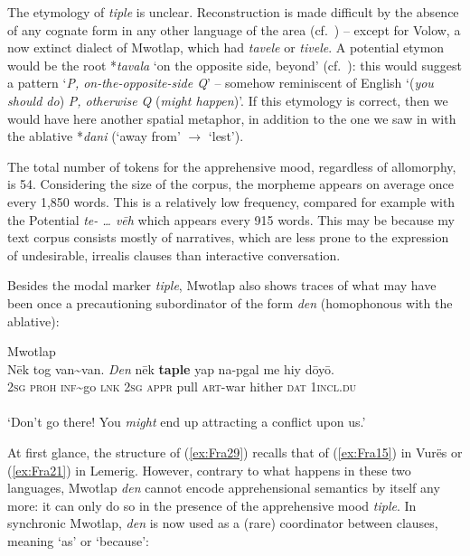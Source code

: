 \documentclass[output=paper,colorlinks,citecolor=brown]{langscibook}
\begin{document}
The etymology of \textit{tiple} is unclear. Reconstruction is made difficult by the absence of any cognate form in any other language of the area (cf.\ ) -- except for Volow, a now extinct dialect of Mwotlap, which had \textit{tavele} or \textit{tivele}. A potential etymon would be the root *\textit{tavala} `on the opposite side, beyond' (cf.\ \citealt[194]{Clark2009}): this would suggest a pattern `\textit{P, on-the-opposite-side Q}' -- somehow reminiscent of English `(\textit{you should do}) \textit{P, otherwise Q} (\textit{might happen})'. If this etymology is correct, then we would have here another spatial metaphor, in addition to the one we saw in  with the ablative *\textit{dani} (`away from' ${\rightarrow}$ `lest'). 

The total number of tokens for the apprehensive mood, regardless of allomorphy, is 54. Considering the size of the corpus, the morpheme appears on average once every 1,850 words. This is a relatively low frequency, compared for example with the Potential  \textit{te- {\ldots} vēh} which appears every 915 words. This may be because my text corpus consists mostly of narratives, which are less prone to the expression of undesirable, irrealis clauses than interactive conversation.

Besides the modal marker \textit{tiple}, Mwotlap also shows traces of what may have been once a precautioning subordinator of the form \textit{den} (homophonous with the ablative):
 
\ea \label{ex:Fra29} \textnormal{Mwotlap}  \\
\gll Nēk tog van\textasciitilde van. \textit{Den} nēk \textbf{taple} yap na-pgal me hiy dōyō. \\
\textsc{2sg} \textsc{proh} \textsc{inf}\textasciitilde go \textsc{lnk} \textsc{2sg} \textsc{appr} pull \textsc{art}-war hither \textsc{dat} \textsc{1incl.du} \\
 \\
`Don't go there! You \textit{might} end up attracting a conflict upon us.' 
\z

\noindent At first glance, the structure of (\ref{ex:Fra29}) recalls that of (\ref{ex:Fra15}) in Vurës or (\ref{ex:Fra21}) in Lemerig. However, contrary to what happens in these two languages, Mwotlap \textit{den} cannot encode apprehensional semantics by itself any more: it can only do so in the presence of the apprehensive mood \textit{tiple}. In synchronic Mwotlap, \textit{den} is now used as a (rare) coordinator between clauses, meaning `as' or `because':
 
\end{document}
